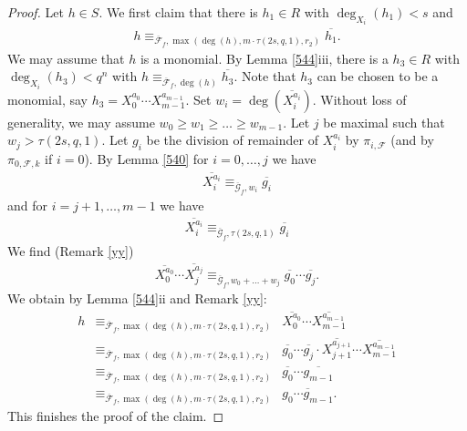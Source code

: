 \documentclass{amsart}
\theoremstyle{plain}
\theoremstyle{definition}
\begin{document}
\begin{proof}
Let $h \in S$.  We first claim that there is $h_1 \in R$ with $\deg_{X_i}(h_1)<s$ and 
\begin{eqnarray*}
h \equiv_{\overline{\mathcal{F}}_f, \max(\deg(h), m \cdot \tau(2s,q,1),r_2)} \overline{h_1}.
\end{eqnarray*}
We may assume that $h$ is a monomial. By Lemma \ref{544}iii, there is a  $h_3 \in R$ with $\deg_{X_i}(h_3)<q^n$ with $h \equiv_{\overline{\mathcal{F}}_f, \deg(h)} \overline{h_3}$. Note that $h_3$ can be chosen to be a monomial, say $h_3=X_0^{a_0}\cdots X_{m-1}^{a_{m-1}}$. Set $w_i=\deg(\overline{X_i^{a_i}})$. Without loss of generality, we may assume $w_0 \geq w_1 \geq \ldots \geq w_{m-1}$. Let $j$ be maximal such that $w_j > \tau(2s,q,1)$. Let $g_i$ be the division of remainder of $X_i^{a_i}$ by $\pi_{i,\mathcal{F}}$ (and by $\pi_{0,\mathcal{F},k}$ if $i=0$). By Lemma \ref{540} for $i=0,\ldots,j$ we have
\begin{eqnarray*}
\overline{X_i^{a_i}} \equiv_{\overline{\mathcal{G}}_f, w_i} \overline{g_i}
\end{eqnarray*}
and for $i=j+1,\ldots,m-1$ we have
\begin{eqnarray*}
\overline{X_i^{a_i}} \equiv_{\overline{\mathcal{G}}_f,\tau(2s,q,1)} \overline{g_i}
\end{eqnarray*}
We find (Remark \ref{yy})
\begin{eqnarray*}
\overline{X_0^{a_0}} \cdots \overline{X_j^{a_j}} \equiv_{\overline{\mathcal{G}}_f, w_0+\ldots+w_j} \overline{g_0} \cdots \overline{g_j}. 
\end{eqnarray*}
We obtain by Lemma \ref{544}ii and Remark \ref{yy}:
\begin{eqnarray*}
h  &\equiv_{\overline{\mathcal{F}}_f, \max(\deg(h),m \cdot \tau(2s,q,1),r_2)}& \overline{X_0^{a_0}} \cdots \overline{X_{m-1}^{a_{m-1}}} \\ 
&\equiv_{\overline{\mathcal{F}}_f, \max(\deg(h),m \cdot \tau(2s,q,1),r_2)}&  \overline{g_0} \cdots \overline{g_j } \cdot \overline{X_{j+1}^{a_{j+1}}} \cdots \overline{X_{m-1}^{a_{m-1}}} \\
&\equiv_{\overline{\mathcal{F}}_f, \max(\deg(h),m \cdot \tau(2s,q,1),r_2)}& \overline{g_0} \cdots \overline{g_{m-1}} \\
&\equiv_{\overline{\mathcal{F}}_f, \max(\deg(h),m \cdot \tau(2s,q,1),r_2)}& \overline{g_0\cdots g_{m-1}}.
\end{eqnarray*}
This finishes the proof of the claim.


\end{proof}
\end{document}
